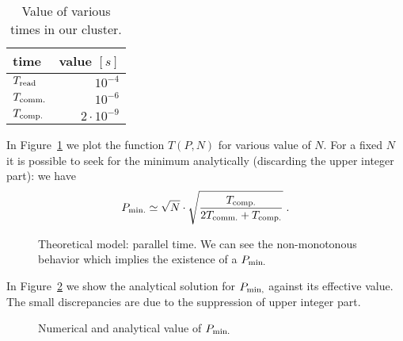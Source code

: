 \documentclass[11pt,a4paper]{article}
\newcommand{\f}{\frac}
\newcommand{\mr}{\ensuremath{\mathrm}}
\numberwithin{equation}{section}
\begin{document}
\begin{table}[h]
    \centering\begin{tabular}{lr}
        \toprule
        \textbf{time} & \textbf{value $[s]$} \\
        \midrule
        $T_{\mr{read}}$ & $10^{-4}$ \\
        $T_{\mr{comm.}}$ & $10^{-6}$ \\
        $T_{\mr{comp.}}$ & $2 \cdot 10^{-9}$ \\
        \bottomrule
    \end{tabular}
    \caption{Value of various times in our cluster.}
    \label{tab:times}
\end{table}
In Figure~\ref{fig:th_mod_1} we plot the function $T(P,N)$ for various value of $N$. For a fixed $N$ it is possible to seek for the minimum analytically (discarding the upper integer part): we have
\begin{equation}
    P_{\mr{min.}} \simeq \sqrt{N} \cdot \sqrt{\f{T_{\mr{comp.}}}{2T_{\mr{comm.}}+T_{\mr{comp.}}}}\;.
\end{equation}
\begin{figure}[h!]
    \centering
    
    \caption{Theoretical model: parallel time. We can see the non-monotonous behavior which implies the existence of a $P_{\mr{min.}}$}
    \label{fig:th_mod_1}
\end{figure}
In Figure~\ref{fig:th_mod_2} we show the analytical solution for $P_{\rm{min,}}$ against its effective value. The small discrepancies are due to the suppression of upper integer part.
\begin{figure}[h!]
    \centering
    
    \caption{Numerical and analytical value of $P_{\mr{min.}}$}
    \label{fig:th_mod_2}
\end{figure}
\end{document}
